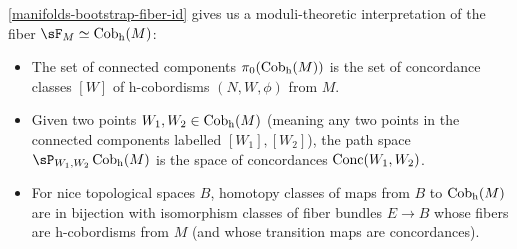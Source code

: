 \begin{nothing}
  \begin{subremark}
    \label{manifolds-bootstrap-fiber-moduli}
    \cref{manifolds-bootstrap-fiber-id} gives us a moduli-theoretic interpretation of the fiber $\sF_M \iso \hCob(M)$:
    \begin{itemize}
    \item The set of connected components $\pi_0(\operatorname{Cob_h}(M))$ is the set of concordance classes $[W]$ of h-cobordisms $(N,W,\phi)$ from $M$.
    \item Given two points $W_1,W_2 \in \operatorname{Cob_h}(M)$ (meaning any two points in the connected components labelled $[W_1],[W_2]$), the path space $\sP_{W_1,W_2}\hCob(M)$ is the space of concordances $\operatorname{Conc}(W_1,W_2)$.
    \item For nice topological spaces $B$, homotopy classes of maps from $B$ to $\operatorname{Cob_h}(M)$ are in bijection with isomorphism classes of fiber bundles $E \to B$ whose fibers are h-cobordisms from $M$ (and whose transition maps are concordances).
    \end{itemize}
  \end{subremark}
\end{nothing}

